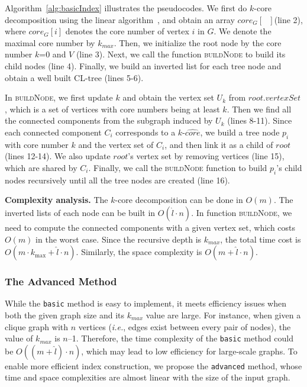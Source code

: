 Algorithm~\ref{alg:basicIndex} illustrates the pseudocodes.
We first do $k$-core decomposition
using the linear algorithm~\cite{kcore2003},
and obtain an array $core_G[\text{ }]$(line 2),
where $core_G[i]$ denotes the core number of vertex $i$ in $G$.
We denote the maximal core number by $k_{max}$.
Then, we initialize the root node by the core number $k$=0 and $V$ (line 3).
Next, we call the function \textsc{buildNode} to build its child nodes (line 4).
Finally, we build an inverted list for each tree node and
obtain a well built CL-tree (lines 5-6).

In \textsc{buildNode}, we first update $k$ and obtain the vertex set $U_k$ from $root.vertexSet$,
which is a set of vertices with core numbers being at least $k$.
Then we find all the connected components from the subgraph induced by $U_k$ (lines 8-11).
Since each connected component $C_i$ corresponds to a $k$-$\widehat {core}$,
we build a tree node $p_i$ with core number $k$ and the vertex set of $C_i$,
and then link it as a child of $root$ (lines 12-14).
We also update $root$'s vertex set by removing vertices (line 15),
which are shared by $C_i$.
Finally, we call the \textsc{buildNode} function to build $p_i$'s child nodes recursively until all the tree nodes are created (line 16).

\textbf{Complexity analysis.}
The $k$-core decomposition can be done in $O(m)$.
The inverted lists of each node can be built in $O({\widehat l}\cdot n)$.
In function \textsc{buildNode}, we need to compute the connected components with a given vertex set,
which costs $O(m)$ in the worst case.
Since the recursive depth is $k_{max}$, the total time cost is $O(m\cdot {k_{\max }}+{\widehat l}\cdot n)$.
Similarly, the space complexity is $O(m+{\widehat l}\cdot n)$.

\subsubsection{The Advanced Method}
\label{advancedIndex}
While the {\tt basic} method is easy to implement,
it meets efficiency issues when both the given graph size and its $k_{max}$ value are large.
For instance, when given a clique graph with $n$ vertices (\textit{i.e.}, edges exist between every pair of nodes),
the value of $k_{max}$ is $n$--1. Therefore, the time complexity of the {\tt basic} method could be $O((m+{\widehat l})\cdot n)$,
which may lead to low efficiency for large-scale graphs.
To enable more efficient index construction, we propose the {\tt advanced} method,
whose time and space complexities are almost linear with the size of the input graph.

